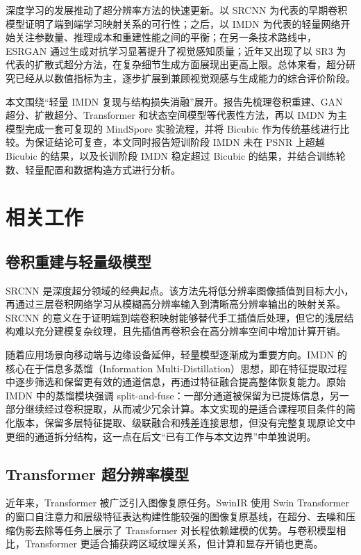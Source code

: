 \documentclass[bwprint]{report}
\begin{document}
深度学习的发展推动了超分辨率方法的快速更新。以 SRCNN 为代表的早期卷积模型证明了端到端学习映射关系的可行性\cite{dong2016srcnn}；之后，以 IMDN 为代表的轻量网络开始关注参数量、推理成本和重建性能之间的平衡\cite{hui2019imdn}；在另一条技术路线中，ESRGAN 通过生成对抗学习显著提升了视觉感知质量\cite{wang2018esrgan}；近年又出现了以 SR3 为代表的扩散式超分方法，在复杂细节生成方面展现出更高上限\cite{saharia2021sr3}。总体来看，超分研究已经从以数值指标为主，逐步扩展到兼顾视觉观感与生成能力的综合评价阶段。

本文围绕“轻量 IMDN 复现与结构损失消融”展开。报告先梳理卷积重建、GAN 超分、扩散超分、Transformer 和状态空间模型等代表性方法，再以 IMDN 为主模型完成一套可复现的 MindSpore 实验流程，并将 Bicubic 作为传统基线进行比较。为保证结论可复查，本文同时报告短训阶段 IMDN 未在 PSNR 上超越 Bicubic 的结果，以及长训阶段 IMDN 稳定超过 Bicubic 的结果，并结合训练轮数、轻量配置和数据构造方式进行分析。

\section{相关工作}
\subsection{卷积重建与轻量级模型}
SRCNN 是深度超分领域的经典起点。该方法先将低分辨率图像插值到目标大小，再通过三层卷积网络学习从模糊高分辨率输入到清晰高分辨率输出的映射关系\cite{dong2016srcnn}。SRCNN 的意义在于证明端到端卷积映射能够替代手工插值后处理，但它的浅层结构难以充分建模复杂纹理，且先插值再卷积会在高分辨率空间中增加计算开销。

随着应用场景向移动端与边缘设备延伸，轻量模型逐渐成为重要方向。IMDN 的核心在于信息多蒸馏（Information Multi-Distillation）思想，即在特征提取过程中逐步筛选和保留更有效的通道信息，再通过特征融合提高整体恢复能力\cite{hui2019imdn}。原始 IMDN 中的蒸馏模块强调 split-and-fuse：一部分通道被保留为已提炼信息，另一部分继续经过卷积提取，从而减少冗余计算。本文实现的是适合课程项目条件的简化版本，保留多层特征提取、级联融合和残差连接思想，但没有完整复现原论文中更细的通道拆分结构，这一点在后文“已有工作与本文边界”中单独说明。

\subsection{Transformer 超分辨率模型}
近年来，Transformer 被广泛引入图像复原任务。SwinIR 使用 Swin Transformer 的窗口自注意力和层级特征表达构建性能较强的图像复原基线，在超分、去噪和压缩伪影去除等任务上展示了 Transformer 对长程依赖建模的优势\cite{liang2021swinir}。与卷积模型相比，Transformer 更适合捕获跨区域纹理关系，但计算和显存开销也更高。
\end{document}
